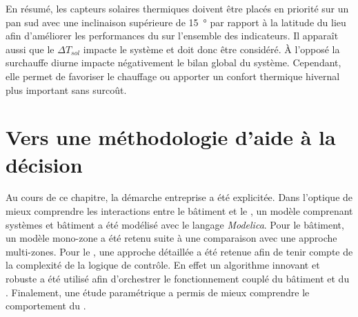En résumé, les capteurs solaires thermiques doivent être placés en priorité sur un pan sud
avec une inclinaison supérieure de \SI{15}{\degree} par rapport à la latitude du lieu afin
d’améliorer les performances du  sur l’ensemble des indicateurs. Il apparaît aussi
que le $\Delta T_{sol}$ impacte le système et doit donc être considéré. À l’opposé la surchauffe
diurne impacte négativement le bilan global du système. Cependant, elle permet de favoriser le
chauffage ou apporter un confort thermique hivernal plus important sans surcoût.





\section{Vers une méthodologie d’aide à la décision} %
\label{sec:vers_une_methodologie_d_aide_a_la_decision}
Au cours de ce chapitre, la démarche entreprise a été explicitée. Dans l’optique de mieux
comprendre les interactions entre le bâtiment et le , un modèle comprenant
systèmes et bâtiment a été modélisé avec le langage \textit{Modelica}. Pour le bâtiment, un
modèle mono-zone a été retenu suite à une comparaison avec une approche multi-zones.
Pour le , une approche détaillée a été retenue afin de tenir compte de la
complexité de la logique de contrôle. En effet un algorithme innovant et robuste a été
utilisé afin d’orchestrer le fonctionnement couplé du bâtiment et du .
Finalement, une étude paramétrique a permis de mieux comprendre le comportement du
.

